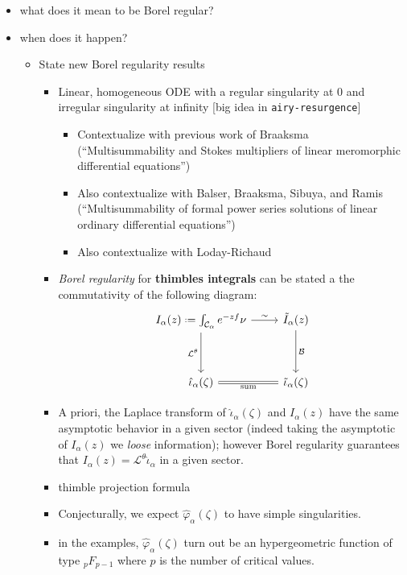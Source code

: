 \documentclass{article}
\theoremstyle{definition}
\newcommand*{\defeq}{\mathrel{\vcenter{\baselineskip0.5ex \lineskiplimit0pt
                     \hbox{\scriptsize.}\hbox{\scriptsize.}}}%
                     =}
\newcommand{\laplace}{\mathcal{L}}
\newcommand{\borel}{\mathcal{B}}
\begin{document}
\color{orange}
\begin{itemize}
\item what does it mean to be Borel regular?
\item when does it happen?
\begin{itemize}
\item State new Borel regularity results
\begin{itemize}
\item Linear, homogeneous ODE with a regular singularity at 0 and irregular singularity at infinity [big idea in {\tt airy-resurgence}]
\begin{itemize}
\item Contextualize with previous work of Braaksma (``Multisummability and Stokes multipliers of linear meromorphic differential equations'')
\item Also contextualize with Balser, Braaksma, Sibuya, and Ramis (``Multisummability of formal power series solutions of linear ordinary differential equations'')
\item Also contextualize with Loday-Richaud
\end{itemize}
\item \emph{Borel regularity} for \textbf{thimbles integrals} can be stated a the commutativity of the following diagram:
\begin{equation}
\begin{tikzcd}
I_{\alpha}(z)\defeq\int_{\mathcal{C}_\alpha}e^{-zf}\nu \arrow[r,"\sim"]\arrow[dd, swap, "\laplace^\theta "] & \tilde{I}_{\alpha}(z)\arrow[dd,"\borel"]\\
& \\
\hat{\iota}_\alpha(\zeta)\arrow[r,equal,swap, "\text{sum}"] & \tilde{\iota}_{\alpha}(\zeta) 
\end{tikzcd}
\end{equation}
\item A priori, the Laplace transform of $\hat{\iota}_\alpha(\zeta)$ and $I_{\alpha}(z)$ have the same asymptotic behavior in a given sector (indeed taking the asymptotic of $I_\alpha(z)$ we \textit{loose} information); however Borel regularity guarantees that $I_{\alpha}(z)=\laplace^{\theta}\hat{\iota}_{\alpha}$ in a given sector.
\item thimble projection formula
\item Conjecturally, we expect $\hat{\varphi}_\alpha(\zeta)$ to have simple singularities. 
\item in the examples, $\hat{\varphi}_\alpha(\zeta)$ turn out be an hypergeometric function of type ${}_pF_{p-1}$ where $p$ is the number of critical values. 

\end{itemize}
\end{itemize}
\end{itemize}
\end{document}
